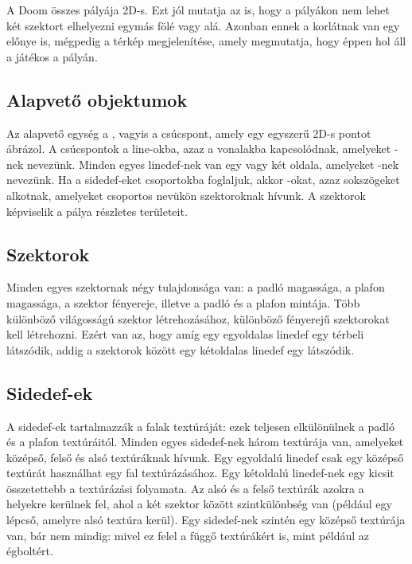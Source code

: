 \documentclass{thesis-ekf}
\theoremstyle{definition}
\begin{document}
A Doom összes pályája 2D-s. Ezt jól mutatja az is, hogy a pályákon nem lehet két
szektort elhelyezni egymás fölé vagy alá. Azonban ennek a korlátnak van egy
előnye is, mégpedig a térkép megjelenítése, amely megmutatja, hogy éppen hol áll
a játékos a pályán. \cite[A Doom pályáinak felépítése]{doomengine}

\subsection{Alapvető objektumok}

Az alapvető egység a , vagyis a csúcspont, amely egy egyszerű
2D-s pontot ábrázol. A csúcspontok a line-okba, azaz a vonalakba kapcsolódnak,
amelyeket -nek nevezünk. Minden egyes linedef-nek van egy vagy
két oldala, amelyeket -nek nevezünk. Ha a sidedef-eket
csoportokba foglaljuk, akkor -okat, azaz sokszögeket alkotnak,
amelyeket csoportos nevükön szektoroknak hívunk. A szektorok képviselik a pálya
részletes területeit. \cite[Alapvető objektumok]{doomengine}

\subsection{Szektorok}

Minden egyes szektornak négy tulajdonsága van: a padló magassága, a plafon
magassága, a szektor fényereje, illetve a padló és a plafon mintája. Több
különböző világosságú szektor létrehozásához, különböző fényerejű szektorokat
kell létrehozni. Ezért van az, hogy amíg egy egyoldalas linedef egy térbeli
 látszódik, addig a szektorok között egy kétoldalas linedef egy
 látszódik. \cite[Szektorok]{doomengine}

\subsection{Sidedef-ek}

A sidedef-ek tartalmazzák a falak textúráját: ezek teljesen elkülönülnek a padló
és a plafon textúráitól. Minden egyes sidedef-nek három textúrája van, amelyeket
középső, felső és alsó textúráknak hívunk. Egy egyoldalú linedef csak egy
középső textúrát használhat egy fal textúrázásához. Egy kétoldalú linedef-nek
egy kicsit összetettebb a textúrázási folyamata. Az alsó és a felső textúrák
azokra a helyekre kerülnek fel, ahol a két szektor között szintkülönbség van
(például egy lépcső, amelyre alsó textúra kerül). Egy sidedef-nek szintén egy
középső textúrája van, bár nem mindig: mivel ez felel a függő textúrákért is,
mint például az égboltért. \cite[Sidedefs]{doomengine}
\end{document}
